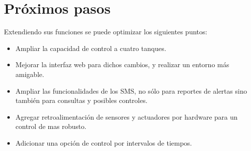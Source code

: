\section{Próximos pasos}

Extendiendo sus funciones se puede optimizar los siguientes puntos:
  \begin{itemize}
    \item Ampliar la capacidad de control a cuatro tanques.
    \item Mejorar la interfaz web para dichos cambios, y realizar un entorno más amigable.
    \item Ampliar las funcionalidades de los SMS, no sólo para reportes de alertas sino también para consultas y posibles controles. 
    \item Agregar retroalimentación de sensores y actuadores por hardware para un control de mas robusto.
    \item Adicionar una opción de control por intervalos de tiempos. 
   \end{itemize} 

